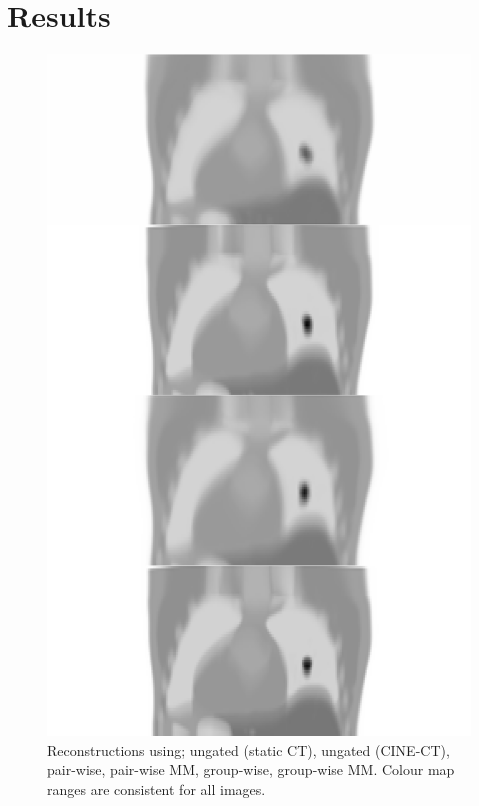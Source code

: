 \section{Results} \label{sec:results}
    \begin{figure}
        \vspace{-0.4cm}
        \centering
        
        \includegraphics[width=1.0\linewidth]{figures/visual_analysis.png}
        
        \vspace{-0.4cm}
        
        \captionsetup{singlelinecheck=false, justification=centering}
        \caption{Reconstructions using; ungated (static \gls{CT}), ungated (CINE-\gls{CT}), pair-wise, pair-wise \gls{MM}, group-wise, group-wise \gls{MM}. Colour map ranges are consistent for all images.}
        
        \label{fig:visual_analysis}
        
        \vspace{-0.4cm}
    \end{figure}
    
